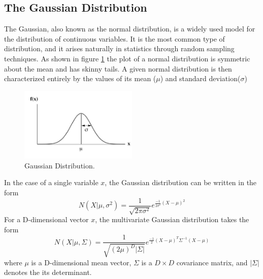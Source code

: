 \documentclass[12pt, a4paper, twoside]{report}
\begin{document}
\subsection{The Gaussian Distribution}
The Gaussian, also known as the normal distribution, is a widely used model for the distribution of continuous variables. It is the most common type of distribution, and it arises naturally in statistics through random sampling techniques. As shown in figure \ref{fig:gmm-normal-dist} the plot of a normal distribution is symmetric about the mean and has skinny tails. A given normal distribution is then characterized entirely by the values of its mean ($\mu$) and standard deviation($\sigma$)
\begin{figure}[!h]
	\centering
	\includegraphics[width=0.5\textwidth]
	{images/chapter4/gmm-normal-dist}
	\caption{Gaussian Distribution.}
	\label{fig:gmm-normal-dist}
\end{figure}

In the case of a single variable $x$, the Gaussian distribution can be written in the form
\begin{equation*}
N(X|\mu,\sigma^2) = \frac{1}{\sqrt{2\pi\sigma^2}}e^{\frac{-1}{2\sigma^2}(X-\mu)^2}
\end{equation*}
For a D-dimensional vector $x$, the multivariate Gaussian distribution takes the form
\begin{equation*}
N(X|\mu,\Sigma) = \frac{1}{\sqrt{(2\mu)^{D}|\Sigma|}}e^{\frac{-1}{2}(X-\mu)^T \Sigma^{-1}(X-\mu)}
\end{equation*}
where $\mu$ is a D-dimensional mean vector, $\Sigma$ is a $D \times D$ covariance matrix, and $|\Sigma|$ denotes the its determinant.
\end{document}

